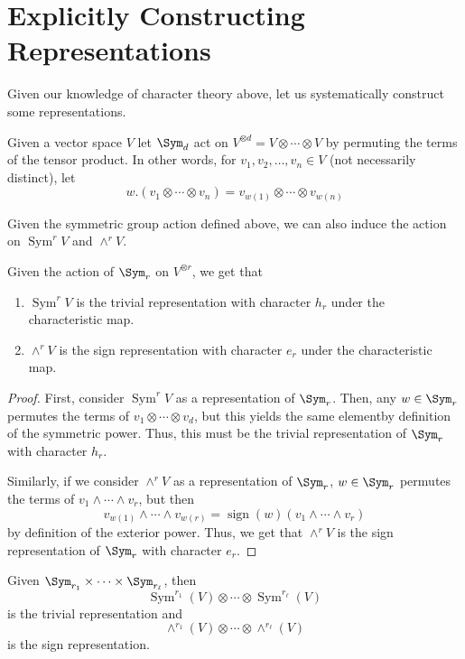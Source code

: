 \documentclass[11pt,leqno,oneside]{amsart}
\numberwithin{thm}{section}
\newcommand{\SymP}{\operatorname{Sym}}
\newcommand{\ExtP}{\wedge}
\newcommand{\sign}{\operatorname{sign}}
\begin{document}
\section{Explicitly Constructing Representations}
Given our knowledge of character theory above, let us systematically
construct some representations.
\begin{defn}
  Given a vector space \(V\) let \(\Sym_d\) act on \(V^{\otimes d} = V
  \otimes \cdots \otimes V\) by permuting the terms of the tensor
  product. In other words, for \(v_1, v_2, \ldots, v_n \in V\) (not
  necessarily distinct), let \[
    w.(v_1 \otimes \cdots \otimes v_n) = v_{w(1)} \otimes \cdots
    \otimes v_{w(n)}
  \]
\end{defn}
Given the symmetric group action defined above, we can also induce the
action on \(\SymP^r V\) and \(\ExtP^r V\).
\begin{prop}
  Given the action of \(\Sym_r\) on \(V^{\otimes r}\), we get that
  \begin{enumerate}
  \item \(\SymP^r V\) is the trivial representation with character
    \(h_r\) under the characteristic map.
  \item \(\ExtP^r V\) is the sign representation with character
    \(e_r\) under the characteristic map.
  \end{enumerate}
\end{prop}
\begin{proof}
   First, consider \(\SymP^{r} V\) as a representation of
  \(\Sym_r\). Then, any \(w \in \Sym_r\) permutes the terms of \(v_1
  \otimes \cdots \otimes v_d\), but this yields the same elementby
  definition of the symmetric power. Thus, this must be the trivial
  representation of \(\Sym_r\) with character \(h_{r}\).

  Similarly, if we consider \(\ExtP^r V\) as a representation of
  \(\Sym_r\), \(w \in \Sym_r\) permutes the terms of \(v_1 \wedge
  \cdots \wedge v_r\), but then \[
    v_{w(1)} \wedge \cdots \wedge v_{w(r)} = \sign(w) (v_1 \wedge
    \cdots \wedge v_r)
  \]
  by definition of the exterior power. Thus, we get that \(\ExtP^r V\)
  is the sign representation of \(\Sym_r\) with character \(e_r\).
\end{proof}
\begin{cor}
  Given \(\Sym_{r_1} \times \cdots \times \Sym_{r_\ell}\),
  then \[
    \SymP^{r_1}(V) \otimes \cdots \otimes \SymP^{r_\ell}(V)
  \]
  is the trivial representation and \[
    \ExtP^{r_1}(V) \otimes \cdots \otimes \ExtP^{r_\ell}(V)
  \]
  is the sign representation.
\end{cor}
\end{document}
